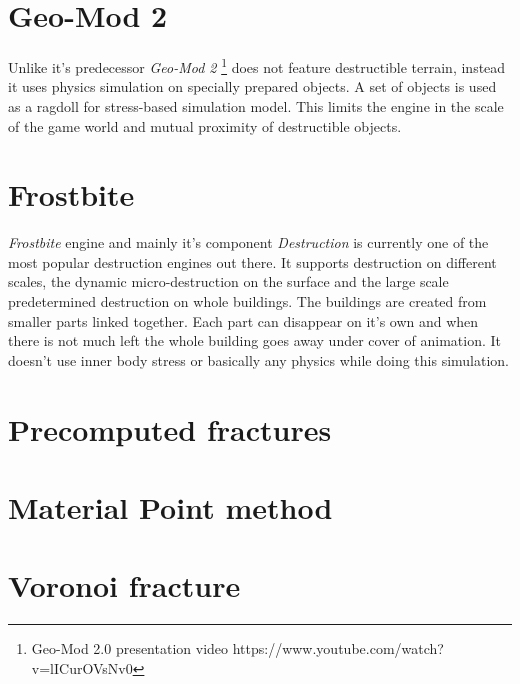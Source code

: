 \section{Geo-Mod 2}
Unlike it's predecessor \emph{Geo-Mod 2} \cite{geomod}\footnote{Geo-Mod 2.0 presentation video https://www.youtube.com/watch?v=lICurOVsNv0} does not feature destructible terrain, instead it uses physics simulation on specially prepared objects. A set of objects is used as a ragdoll for stress-based simulation model. This limits the engine in the scale of the game world and mutual proximity of destructible objects.

\section{Frostbite}
\emph{Frostbite} \cite{frostbite} engine and mainly it's component \emph{Destruction} \cite{destruction} is currently one of the most popular destruction engines out there. It supports destruction on different scales, the dynamic micro-destruction on the surface and the large scale predetermined destruction on whole buildings. The buildings are created from smaller parts linked together. Each part can disappear on it's own and when there is not much left the whole building goes away under cover of animation. 
It doesn't use inner body stress or basically any physics while doing this simulation.

\section{Precomputed fractures}


\section{Material Point method}

\section{Voronoi fracture}

